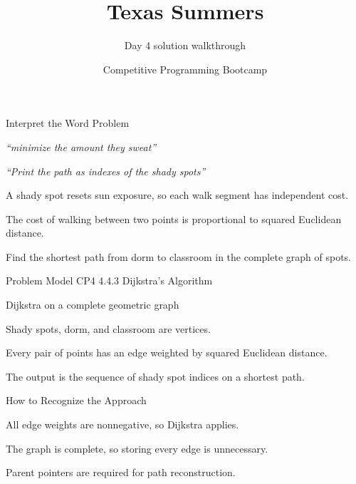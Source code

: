\documentclass[aspectratio=169,11pt]{beamer}
\title[texassummers]{Texas Summers}
\subtitle{Day 4 solution walkthrough}
\author[Solution Deck]{Competitive Programming Bootcamp}
\date{}
\begin{document}
\begin{frame}[plain]
  \titlepage
\end{frame}

\begin{frame}{Interpret the Word Problem}
\small
{}
\begin{tightitemize}
  \item \textit{``minimize the amount they sweat''}
  \item \textit{``Print the path as indexes of the shady spots''}
\end{tightitemize}

\vspace{0.18cm}
\begin{tightitemize}
  \item A shady spot resets sun exposure, so each walk segment has independent cost.
  \item The cost of walking between two points is proportional to squared Euclidean distance.
  \item Find the shortest path from dorm to classroom in the complete graph of spots.
\end{tightitemize}
\end{frame}







\begin{frame}{Problem Model}
\small
{} CP4 4.4.3 Dijkstra's Algorithm

\vspace{0.25cm}
 Dijkstra on a complete geometric graph

\vspace{0.25cm}
\begin{tightitemize}
  \item Shady spots, dorm, and classroom are vertices.
  \item Every pair of points has an edge weighted by squared Euclidean distance.
  \item The output is the sequence of shady spot indices on a shortest path.
\end{tightitemize}
\end{frame}

\begin{frame}{How to Recognize the Approach}
\begin{tightitemize}
  \item All edge weights are nonnegative, so Dijkstra applies.
  \item The graph is complete, so storing every edge is unnecessary.
  \item Parent pointers are required for path reconstruction.
\end{tightitemize}
\end{frame}
\end{document}
